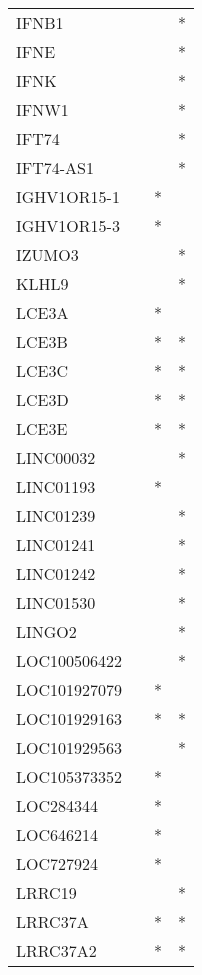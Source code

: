 \begin{longtable}{lccc}
IFNB1        &       &    &       * \\
IFNE         &       &    &       * \\
IFNK         &       &    &       * \\
IFNW1        &       &    &       * \\
IFT74        &       &    &       * \\
IFT74-AS1    &       &    &       * \\
IGHV1OR15-1  &       &  * &         \\
IGHV1OR15-3  &       &  * &         \\
IZUMO3       &       &    &       * \\
KLHL9        &       &    &       * \\
LCE3A        &       &  * &         \\
LCE3B        &       &  * &       * \\
LCE3C        &       &  * &       * \\
LCE3D        &       &  * &       * \\
LCE3E        &       &  * &       * \\
LINC00032    &       &    &       * \\
LINC01193    &       &  * &         \\
LINC01239    &       &    &       * \\
LINC01241    &       &    &       * \\
LINC01242    &       &    &       * \\
LINC01530    &       &    &       * \\
LINGO2       &       &    &       * \\
LOC100506422 &       &    &       * \\
LOC101927079 &       &  * &         \\
LOC101929163 &       &  * &       * \\
LOC101929563 &       &    &       * \\
LOC105373352 &       &  * &         \\
LOC284344    &       &  * &         \\
LOC646214    &       &  * &         \\
LOC727924    &       &  * &         \\
LRRC19       &       &    &       * \\
LRRC37A      &       &  * &       * \\
LRRC37A2     &       &  * &       * \\

\end{longtable}
